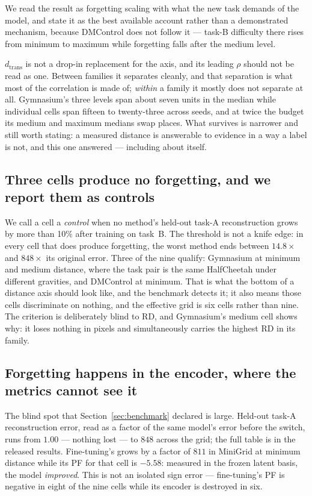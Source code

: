 \documentclass[11pt]{article}
\begin{document}
We read the result as forgetting scaling with what the new task demands of the
model, and state it as the best available account rather than a demonstrated
mechanism, because DMControl does not follow it --- task-B difficulty there
rises from minimum to maximum while forgetting falls after the medium level.

$d_{\mathrm{trans}}$ is not a drop-in replacement for the axis, and its leading
$\rho$ should not be read as one. Between families it separates cleanly, and
that separation is what most of the correlation is made of; \emph{within} a
family it mostly does not separate at all. Gymnasium's three levels span about
seven units in the median while individual cells span fifteen to twenty-three
across seeds, and at twice the budget its medium and maximum medians swap
places. What survives is narrower and still worth stating: a measured distance
is answerable to evidence in a way a label is not, and this one answered ---
including about itself.

\subsection{Three cells produce no forgetting, and we report them as controls}
\label{sec:results:controls}

We call a cell a \emph{control} when no method's held-out task-A reconstruction
grows by more than 10\% after training on task~B. The threshold is not a knife
edge: in every cell that does produce forgetting, the worst method ends between
$14.8\times$ and $848\times$ its original error. Three of the nine qualify:
Gymnasium at minimum and medium distance, where the task pair is the same
HalfCheetah under different gravities, and DMControl at minimum. That is what
the bottom of a distance axis should look like, and the benchmark detects it;
it also means those cells discriminate on nothing, and the effective grid is
six cells rather than nine. The criterion is deliberately blind to RD, and
Gymnasium's medium cell shows why: it loses nothing in pixels and
simultaneously carries the highest RD in its family.

\subsection{Forgetting happens in the encoder, where the metrics cannot see it}
\label{sec:results:encoder}

The blind spot that Section~\ref{sec:benchmark} declared is large. Held-out
task-A reconstruction error, read as a factor of the same model's error before
the switch, runs from $1.00$ --- nothing lost --- to $848$ across the grid; the
full table is in the released results. Fine-tuning's grows by a factor of $811$
in MiniGrid at minimum distance while its PF for that cell is $-5.58$: measured
in the frozen latent basis, the model \emph{improved}. This is not an isolated
sign error --- fine-tuning's PF is negative in eight of the nine cells while its
encoder is destroyed in six.
\end{document}

